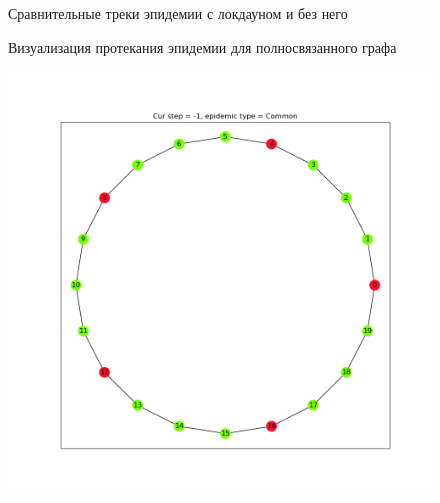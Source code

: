 \begin{figure}[h]
\begin{center}
\begin{minipage}{0.49\linewidth}
				\centering
				Сравнительные треки эпидемии с локдауном и без него
			\end{minipage}
		\end{center}
	
		\caption{Визуализация протекания эпидемии для полносвязанного графа}\label{pic:evidence_1}
	\end{figure}

	\begin{figure}[h]
		\begin{center}
			\begin{minipage}{0.49\linewidth}
				\includegraphics[width=\linewidth, keepaspectratio]{../figs/evidence3/init}
				

\end{minipage}
\end{center}
\end{figure}

